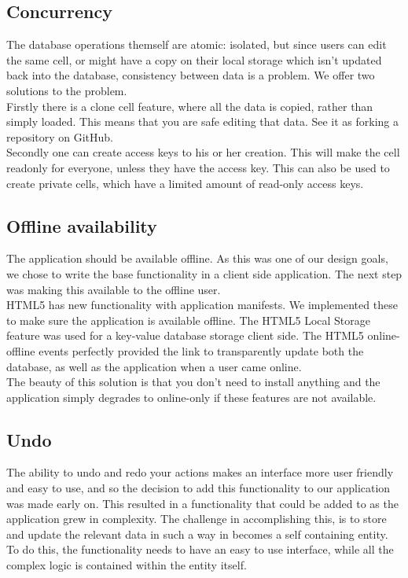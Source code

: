 \documentclass[10pt,a4paper]{report}
\begin{document}
		\subsection{Concurrency}
			The database operations themself are atomic: isolated, but since users can edit the same cell, or might have a copy on their local storage which isn't updated back into the database, consistency between data is a problem. We offer two solutions to the problem.\\ 
			
			Firstly there is a clone cell feature, where all the data is copied, rather than simply loaded. This means that you are safe editing that data. See it as forking a repository on GitHub.\\
			
			Secondly one can create access keys to his or her creation. This will make the cell readonly for everyone, unless they have the access key. This can also be used to create private cells, which have a limited amount of read-only access keys.
		
		\subsection{Offline availability}
			The application should be available offline. As this was one of our design goals, we chose to write the base functionality in a client side application. The next step was making this available to the offline user.\\
			HTML5 has new functionality with application manifests. We implemented these to make sure the application is available offline. The HTML5 Local Storage feature was used for a key-value database storage client side. The HTML5 online-offline events perfectly provided the link to transparently update both the database, as well as the application when a user came online.\\
			The beauty of this solution is that you don't need to install anything and the application simply degrades to online-only if these features are not available.
		
		\subsection{Undo}
			The ability to undo and redo your actions makes an interface more user friendly and easy to use, and so the decision to add this functionality to our application was made early on. This resulted in a functionality that could be added to as the application grew in complexity. The challenge in accomplishing this, is to store and update the relevant data in such a way in becomes a self containing entity. To do this, the functionality needs to have an easy to use interface, while all the complex logic is contained within the entity itself.
			
\end{document}
